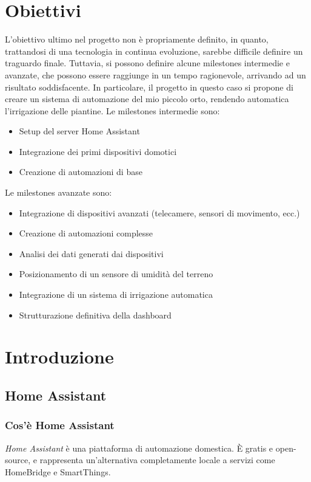 \documentclass[11pt, a4paper]{article}
\begin{document}
\section{Obiettivi}
L'obiettivo ultimo nel progetto non è propriamente definito, in quanto,
trattandosi di una tecnologia 
in continua evoluzione, sarebbe difficile
definire un traguardo 
finale. Tuttavia, si 
possono definire alcune milestones
intermedie e avanzate, 
che possono essere raggiunge in un tempo ragionevole,
arrivando ad un risultato soddisfacente.
In particolare, il progetto in questo caso si propone di creare un sistema
di automazione del mio piccolo orto, rendendo automatica l'irrigazione delle piantine.
Le milestones intermedie sono:
\begin{itemize}
    \item Setup del server Home Assistant
    \item Integrazione dei primi dispositivi domotici
    \item Creazione di automazioni di base
    
\end{itemize}

Le milestones avanzate sono:
\begin{itemize}
    \item Integrazione di dispositivi avanzati (telecamere, sensori di movimento, ecc.)
    \item Creazione di automazioni complesse
    \item Analisi dei dati generati dai dispositivi
    \item Posizionamento di un sensore di umidità del terreno
    \item Integrazione di un sistema di irrigazione automatica
    \item Strutturazione definitiva della dashboard
\end{itemize}

\section{Introduzione}

\subsection{Home Assistant}

\subsubsection{Cos'è Home Assistant}
\textit{Home Assistant} è una piattaforma di automazione domestica. È gratis e open-source, e
rappresenta un'alternativa completamente locale a servizi come HomeBridge e SmartThings.
\end{document}
